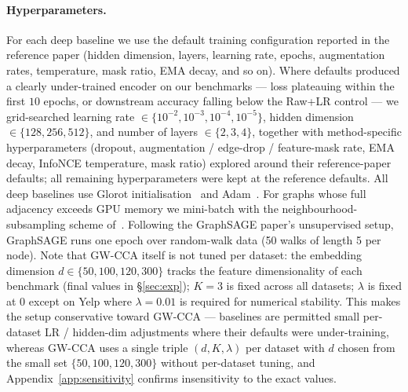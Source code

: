 \documentclass{article}
\begin{document}
\paragraph{Hyperparameters.}
For each deep baseline we use the default training configuration reported
in the reference paper (hidden dimension, layers, learning rate, epochs,
augmentation rates, temperature, mask ratio, EMA decay, and so on). Where
defaults produced a clearly under-trained encoder on our benchmarks ---
loss plateauing within the first $10$ epochs, or downstream accuracy
falling below the Raw+LR control --- we grid-searched learning rate
$\in \{10^{-2}, 10^{-3}, 10^{-4}, 10^{-5}\}$, hidden dimension
$\in \{128, 256, 512\}$, and number of layers $\in \{2, 3, 4\}$, together
with method-specific hyperparameters (dropout, augmentation /
edge-drop / feature-mask rate, EMA decay, InfoNCE temperature, mask
ratio) explored around their reference-paper defaults; all remaining
hyperparameters were kept at the reference defaults. All deep baselines
use Glorot initialisation~\citep{glorot2010understanding} and
Adam~\citep{kingma2014adam}. For graphs whose full adjacency exceeds GPU
memory we mini-batch with the neighbourhood-subsampling scheme
of~\citet{hamilton2017inductive}. Following the GraphSAGE paper's
unsupervised setup, GraphSAGE runs one epoch over random-walk data (50
walks of length 5 per node).
Note that GW-CCA itself is not tuned per dataset: the embedding dimension
$d \in \{50, 100, 120, 300\}$ tracks the feature dimensionality of each
benchmark (final values in \S\ref{sec:exp}); $K = 3$ is fixed across all
datasets; $\lambda$ is fixed at $0$ except on Yelp where $\lambda = 0.01$
is required for numerical stability. This makes the setup conservative
toward GW-CCA --- baselines are permitted small per-dataset LR / hidden-dim
adjustments where their defaults were under-training, whereas GW-CCA
uses a single triple $(d, K, \lambda)$ per dataset with $d$ chosen from
the small set $\{50, 100, 120, 300\}$ without per-dataset tuning, and
Appendix~\ref{app:sensitivity} confirms insensitivity to the exact
values.
\end{document}
